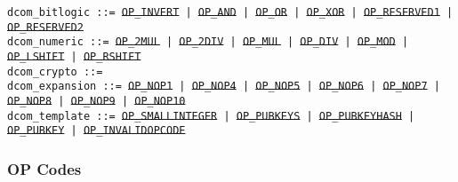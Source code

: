 \documentclass{article}
\begin{document}
\noindent \hangindent=0.7cm
\texttt{dcom\_bitlogic ::=
  \sout{OP\_INVERT} | \sout{OP\_AND} | \sout{OP\_OR} | \sout{OP\_XOR} |
  \sout{OP\_RESERVED1} | \sout{OP\_RESERVED2}} \\

\noindent \hangindent=0.7cm
\texttt{dcom\_numeric ::=
  \sout{OP\_2MUL} | \sout{OP\_2DIV} | \sout{OP\_MUL} |
  \sout{OP\_DIV} | \sout{OP\_MOD} | \sout{OP\_LSHIFT} | \sout{OP\_RSHIFT}} \\

\noindent \hangindent=0.7cm
\texttt{dcom\_crypto ::=} \\

\noindent \hangindent=0.7cm
\texttt{dcom\_expansion ::=
  \sout{OP\_NOP1} | \sout{OP\_NOP4} | \sout{OP\_NOP5} |
  \sout{OP\_NOP6} | \sout{OP\_NOP7} | \sout{OP\_NOP8} | \sout{OP\_NOP9} |
  \sout{OP\_NOP10}} \\

\noindent \hangindent=0.7cm
\texttt{dcom\_template ::=
  \sout{OP\_SMALLINTEGER} | \sout{OP\_PUBKEYS} | \sout{OP\_PUBKEYHASH} |
  \sout{OP\_PUBKEY} | \sout{OP\_INVALIDOPCODE}}


\pagebreak

\subsubsection{OP Codes}
\end{document}
